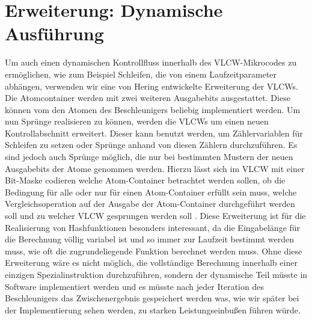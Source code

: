 \section{Erweiterung: Dynamische Ausführung}
Um auch einen dynamischen Kontrollfluss innerhalb des VLCW-Mikrocodes zu ermöglichen, wie zum Beispiel Schleifen, die von einem Laufzeitparameter abhängen,
verwenden wir eine von Hering \cite{hering2020} entwickelte Erweiterung der VLCWs. Die Atomcontainer werden mit zwei weiteren Ausgabebits ausgestattet.
Diese können vom den Atomen des Beschleunigers beliebig implementiert werden. Um nun Sprünge realisieren zu können, werden die VLCWs um einen neuen Kontrollabschnitt erweitert.
Dieser kann benutzt werden, um Zählervariablen für Schleifen zu setzen oder Sprünge anhand von diesen Zählern durchzuführen. Es sind jedoch auch Sprünge möglich,
die nur bei bestimmten Mustern der neuen Ausgabebits der Atome genommen werden. Hierzu lässt sich im VLCW mit einer Bit-Maske codieren welche Atom-Container betrachtet werden sollen,
ob die Bedingung für alle oder nur für einen Atom-Container erfüllt sein muss, welche Vergleichsoperation auf der Ausgabe der Atom-Container durchgeführt werden soll und
zu welcher VLCW gesprungen werden soll \cite{hering2020}. Diese Erweiterung ist für die Realisierung von Hashfunktionen besonders interessant,
da die Eingabelänge für die Berechnung völlig variabel ist und so immer zur Laufzeit bestimmt werden muss, wie oft die zugrundeliegende Funktion berechnet werden muss.
Ohne diese Erweiterung wäre es nicht möglich, die vollständige Berechnung innerhalb einer einzigen Spezialinstruktion durchzuführen, sondern der dynamische Teil müsste
in Software implementiert werden und es müsste nach jeder Iteration des Beschleunigers das Zwischenergebnis gespeichert werden was, wie wir später bei der Implementierung
sehen werden, zu starken Leistungseinbußen führen würde.